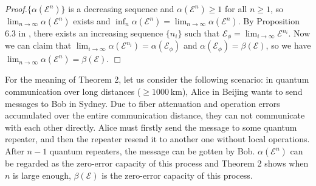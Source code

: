 \documentclass{article}
\def\E{\mathcal{E}}
\begin{document}
{\it Proof.}$\{\alpha(\E^n)\}$ is a decreasing sequence and $\alpha(\E^n)\geq 1$ for all $n\geq 1$, so $\lim_{n\rightarrow \infty}\alpha(\E^n)$ exists and $\inf_{n}\alpha(\E^{n})=\lim_{n\rightarrow \infty}\alpha(\E^n)$. By Proposition 6.3 in \cite{wolf2012quantum}, there exists an increasing sequence $\{n_{i}\}$ such that $\E_{\phi}=\lim_{i\rightarrow \infty}\E^{n_{i}}$. Now we can claim that $\lim_{i\rightarrow \infty}\alpha(\E^{n_{i}})=\alpha(\E_{\phi})$ and $\alpha(\E_{\phi})=\beta(\E)$, so we have $\lim_{n\rightarrow \infty}\alpha(\E^n)=\beta(\E)$.
\hfill $\Box$

For the meaning of Theorem 2, let us consider the following scenario: in quantum communication over long distances ($\geq 1000$ km), Alice in Beijing wants to send messages to Bob in Sydney. Due to fiber attenuation and operation errors accumulated over the entire communication distance, they can not communicate with each other directly. Alice must firstly send the message to some quantum repeater, and then the repeater resend it to another one without local operations. After $n-1$ quantum repeaters, the message can be gotten by Bob. $\alpha(\E^n)$ can be regarded as the zero-error capacity of this process and   Theorem 2 shows when $n$ is large enough, $\beta(\E)$ is the zero-error capacity of this process.\\
\end{document}
